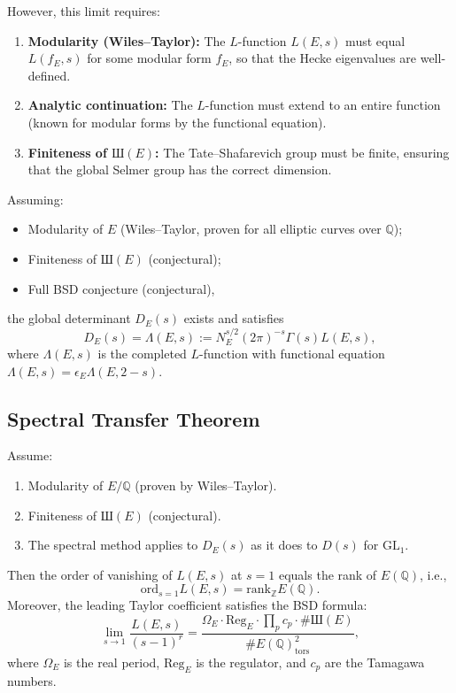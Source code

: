 However, this limit requires:
\begin{enumerate}
\item \textbf{Modularity (Wiles–Taylor):} The $L$-function $L(E, s)$ must equal $L(f_E, s)$ for some modular form $f_E$, so that the Hecke eigenvalues are well-defined.
\item \textbf{Analytic continuation:} The $L$-function must extend to an entire function (known for modular forms by the functional equation).
\item \textbf{Finiteness of $\text{Ш}(E)$:} The Tate–Shafarevich group must be finite, ensuring that the global Selmer group has the correct dimension.
\end{enumerate}

\begin{theorem}\label{thm:conditional-DE}
Assuming:
\begin{itemize}
\item Modularity of $E$ (Wiles–Taylor, proven for all elliptic curves over $\mathbb{Q}$);
\item Finiteness of $\text{Ш}(E)$ (conjectural);
\item Full BSD conjecture (conjectural),
\end{itemize}
the global determinant $D_E(s)$ exists and satisfies
\[
D_E(s) = \Lambda(E, s) := N_E^{s/2} (2\pi)^{-s} \Gamma(s) L(E, s),
\]
where $\Lambda(E, s)$ is the completed $L$-function with functional equation $\Lambda(E, s) = \epsilon_E \Lambda(E, 2-s)$.
\end{theorem}

\subsection{Spectral Transfer Theorem}

\begin{theorem}\label{thm:spectral-transfer-BSD}
Assume:
\begin{enumerate}
\item Modularity of $E/\mathbb{Q}$ (proven by Wiles–Taylor).
\item Finiteness of $\text{Ш}(E)$ (conjectural).
\item The spectral method applies to $D_E(s)$ as it does to $D(s)$ for $\mathrm{GL}_1$.
\end{enumerate}
Then the order of vanishing of $L(E, s)$ at $s = 1$ equals the rank of $E(\mathbb{Q})$, i.e.,
\[
\text{ord}_{s=1} L(E, s) = \text{rank}_{\mathbb{Z}} E(\mathbb{Q}).
\]
Moreover, the leading Taylor coefficient satisfies the BSD formula:
\[
\lim_{s \to 1} \frac{L(E, s)}{(s-1)^r} = \frac{\Omega_E \cdot \text{Reg}_E \cdot \prod_p c_p \cdot \#\text{Ш}(E)}{\#E(\mathbb{Q})_{\text{tors}}^2},
\]
where $\Omega_E$ is the real period, $\text{Reg}_E$ is the regulator, and $c_p$ are the Tamagawa numbers.
\end{theorem}

